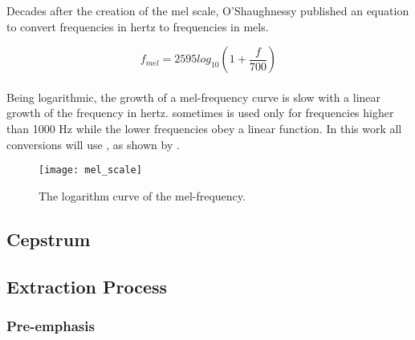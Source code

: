 Decades after the creation of the mel scale, O'Shaughnessy \autocite{oshaughnessy.1987}
published an equation to convert frequencies in hertz to frequencies in mels.

\begin{equation}
    f_{mel} = 2595 log_{10}(1 + \frac{f}{700})
    \label{eq:mel_conversion}
\end{equation}
\\
\noindent Being logarithmic, the growth of a mel-frequency curve is slow with a
linear growth of the frequency in hertz.  sometimes
is used only for frequencies higher than 1000 Hz while the lower frequencies obey
a linear function. In this work all conversions will use ,
as shown by .

\begin{figure}[ht]
    \centering
    \texttt{[image: mel\_scale]}
    \caption{The logarithm curve of the mel-frequency.}
    \label{fig:mel_scale}
\end{figure}


\subsection{Cepstrum}


\subsection{Extraction Process}


\subsubsection{Pre-emphasis}